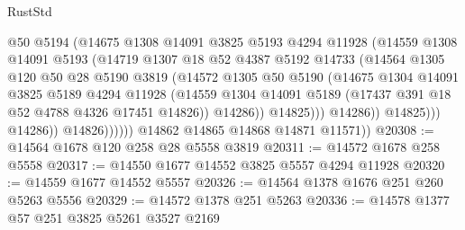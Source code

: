 \begin{lexlean}{RustStd}
\begin{coremodule}
                                @50
                                @5194
                                (@14675
                                  @1308
                                  @14091
                                  @3825
                                  @5193
                                  @4294
                                  @11928
                                  (@14559
                                    @1308
                                    @14091
                                    @5193
                                    (@14719
                                      @1307
                                      @18
                                      @52
                                      @4387
                                      @5192
                                      @14733
                                      (@14564
                                        @1305
                                        @120
                                        @50
                                        @28
                                        @5190
                                        @3819
                                        (@14572
                                          @1305
                                          @50
                                          @5190
                                          (@14675
                                            @1304
                                            @14091
                                            @3825
                                            @5189
                                            @4294
                                            @11928
                                            (@14559
                                              @1304
                                              @14091
                                              @5189
                                              (@17437 @391 @18 @52 @4788 @4326 @17451 @14826))
                                            @14286))
                                        @14825)))
                                  @14286))
                              @14825)))
                        @14286))
                    @14826))))))
        @14862
        @14865
        @14868
        @14871
        @11571))
@20308 := @14564 @1678 @120 @258 @28 @5558 @3819
@20311 := @14572 @1678 @258 @5558
@20317 := @14550 @1677 @14552 @3825 @5557 @4294 @11928
@20320 := @14559 @1677 @14552 @5557
@20326 := @14564 @1378 @1676 @251 @260 @5263 @5556
@20329 := @14572 @1378 @251 @5263
@20336 := @14578 @1377 @57 @251 @3825 @5261 @3527 @2169

\end{coremodule}
\end{lexlean}
